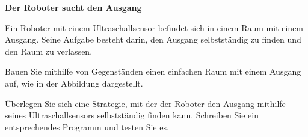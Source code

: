 \begin{myexercise}
    \textbf{Der Roboter sucht den Ausgang}

    Ein Roboter mit einem Ultraschallsensor befindet sich
    in einem Raum mit einem Ausgang. Seine Aufgabe besteht
    darin, den Ausgang selbstständig zu finden und den
    Raum zu verlassen.

    \begin{center}
    \end{center}

    Bauen Sie mithilfe von Gegenständen einen einfachen
    Raum mit einem Ausgang auf, wie in der Abbildung
    dargestellt.

    Überlegen Sie sich eine Strategie, mit der der Roboter
    den Ausgang mithilfe seines Ultraschallsensors
    selbstständig finden kann. Schreiben Sie ein
    entsprechendes Programm und testen Sie es.




\end{myexercise}
